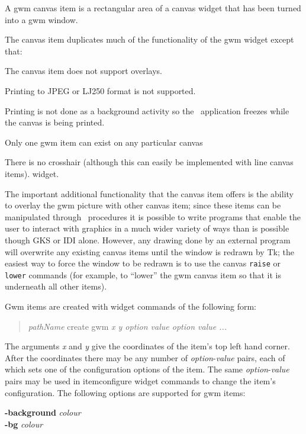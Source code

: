 A gwm canvas item is a rectangular area of a canvas widget that has been
turned into a gwm window. 

The canvas item duplicates much of the functionality of the gwm widget
except that:

\begin{description}
\item The canvas item does not support overlays.
\item Printing to JPEG or LJ250 format is not supported.
\item Printing is not done as a background activity so the \Tk\ application
freezes while the canvas is being printed.
\item Only one gwm item can exist on any particular canvas
\item There is no crosshair (although this can easily be implemented with
line canvas items).
widget. 
\end{description}

The important additional functionality that the canvas item offers is the
ability to overlay the gwm picture with other canvas item; since these items
can be manipulated through \Tcl\ procedures it is possible to write programs
that enable the user to interact with graphics in a much wider variety of
ways than is possible though GKS or IDI alone. However, any drawing done
by an external program will overwrite any existing canvas items until the
window is redrawn by Tk; the easiest way to force the window to be redrawn
is to use the canvas {\tt raise} or {\tt lower} commands (for example, to
``lower'' the gwm canvas item so that it is underneath all  other items).

Gwm items are created with widget commands of the following form:

\begin{quote}
{\em pathName} create gwm {\em x y option value option value ...}
\end{quote}

The arguments {\em x} and {\em y} give the coordinates of the item's
top left hand corner. After the coordinates there may be any number of
{\em option}-{\em value} pairs, each of which sets one of the
configuration options of the item. The same {\em option}-{\em value}
pairs may be used in itemconfigure widget commands to change the item's
configuration. The following options are supported for gwm items:

{\bf -background} {\em colour}\\
{\bf -bg} {\em colour}

